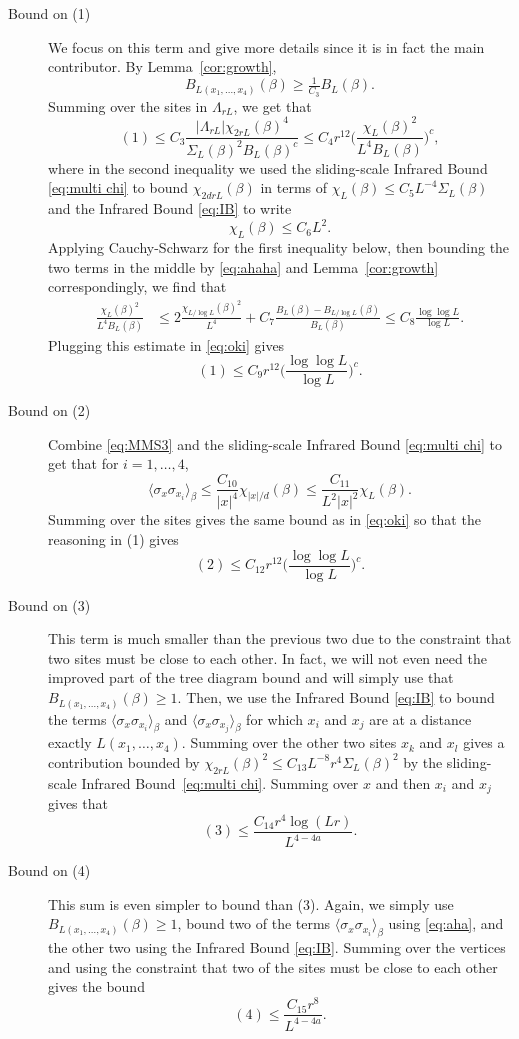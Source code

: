 \documentclass[a4paper,oneside,11pt]{article}
\newcommand{\be}[1]{\begin{equation}\label{#1}}
\newcommand{\ee}{\end{equation}}
\numberwithin{equation}{section}
\numberwithin{equation}{section}
\numberwithin{equation}{section}
\def\be{\begin{equation}}
\def\ee{\end{equation}}
\begin{document}
\begin{description}
\item[Bound on (1)] We focus on this term and give more details since it is in fact the main contributor. By Lemma~\ref{cor:growth}, 
\be\label{eq:nt}
B_{L(x_1,\dots,x_4)}(\beta)\ge \tfrac1{C_3}B_L(\beta).
\ee
 Summing over the sites in $\Lambda_{rL}$, we get that
 \be\label{eq:oki}
 (1)\le C_3 \frac{|\Lambda_{rL}|\chi_{2rL}(\beta)^4}{\Sigma_L(\beta)^2B_L(\beta)^c}\le C_4r^{12}\Big(\frac{\chi_L(\beta)^2}{L^4B_L(\beta)}\Big)^c,
 \ee
 where in the second inequality we used the sliding-scale Infrared Bound \eqref{eq:multi chi} to bound $\chi_{2drL}(\beta)$ in terms of $\chi_L(\beta)\le C_5L^{-4}\Sigma_L(\beta)$ and the Infrared Bound \eqref{eq:IB} to   
  write
  \be\label{eq:ahaha}
\chi_L(\beta)\le C_6L^2.
\ee
Applying Cauchy-Schwarz for the first inequality below,  then bounding the two terms in the middle by \eqref{eq:ahaha} and Lemma~\ref{cor:growth} correspondingly, 
we find that 
\begin{align}
\frac{\chi_L(\beta)^2}{L^4B_L(\beta)}
&\le 2\frac{\chi_{L/\log L}(\beta)^2}{L^4}+C_7\frac{B_L(\beta)-B_{L/\log L}(\beta)}{B_L(\beta)}\le C_8\frac{\log \log L}{\log L}.
\end{align}
Plugging this estimate in \eqref{eq:oki} gives
\be
(1)\le C_9r^{12}\Big(\frac{\log \log L}{\log L}\Big)^c.
\ee
 


\item[Bound on (2)] Combine \eqref{eq:MMS3} and  the sliding-scale Infrared Bound \eqref{eq:multi chi} to get that for $i=1,\dots,4$, 
\be\label{eq:aha}
\langle\sigma_x\sigma_{x_i}\rangle_\beta\le \frac{C_{10}}{|x|^4}\chi_{|x|/d}(\beta)\le \frac{C_{11}}{L^2|x|^2}\chi_L(\beta).
\ee
Summing over the sites gives the same bound as in \eqref{eq:oki} so that the reasoning in (1) gives
\be
(2)\le C_{12}r^{12}\Big(\frac{\log \log L}{\log L}\Big)^c.
\ee
\item[Bound on (3)] This term is much smaller than the previous two due to the constraint that two sites must be close to each other. In fact, we will not even need the improved part of the tree diagram bound and  will simply use that $B_{L(x_1,\dots,x_4)}(\beta)\ge1$. Then, we use the Infrared Bound \eqref{eq:IB} to bound the terms $\langle\sigma_x\sigma_{x_i}\rangle_\beta$ and $\langle\sigma_x\sigma_{x_j}\rangle_\beta$ for which $x_i$ and $x_j$ are at a distance exactly $L(x_1,\dots,x_4)$. Summing over the other two sites $x_k$ and $x_l$ gives a contribution bounded by $\chi_{2rL}(\beta)^2\le C_{13}L^{-8}r^4\Sigma_L(\beta)^2$ by the sliding-scale Infrared Bound~\eqref{eq:multi chi}. Summing over $x$ and then $x_i$ and $x_j$ gives that 
\be
(3)\le \frac{C_{14}r^4\log(Lr)}{L^{4-4a}}.
\ee
\item[Bound on (4)] This sum is even simpler to bound than (3). Again, we simply use $B_{L(x_1,\dots,x_4)}(\beta)\ge1$, bound two of the terms $\langle\sigma_x\sigma_{x_i}\rangle_\beta$ using \eqref{eq:aha}, and the other two using the Infrared Bound \eqref{eq:IB}. Summing over the vertices and using the constraint that two of the sites must be close to each other gives the bound 
\be
(4)\le \frac{C_{15}r^8}{L^{4-4a}}.
\ee
\end{description}
\end{document}
